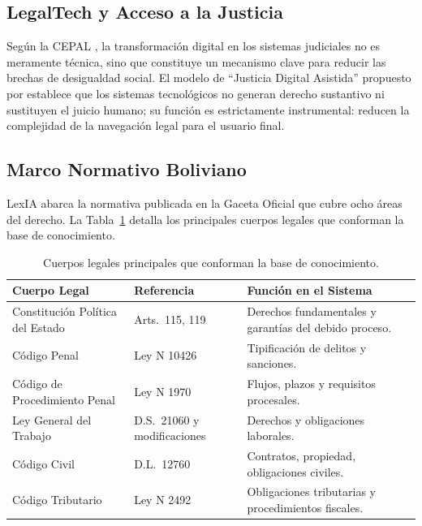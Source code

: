 \documentclass[12pt, letterpaper]{report}
\begin{document}
\subsection{LegalTech y Acceso a la Justicia}

Seg\'{u}n la CEPAL \cite{cepal2021}, la transformaci\'{o}n digital en los sistemas judiciales no es meramente t\'{e}cnica, sino que constituye un mecanismo clave para reducir las brechas de desigualdad social. El modelo de ``Justicia Digital Asistida'' propuesto por \textcite{susskind2019} establece que los sistemas tecnol\'{o}gicos no generan derecho sustantivo ni sustituyen el juicio humano; su funci\'{o}n es estrictamente instrumental: reducen la complejidad de la navegaci\'{o}n legal para el usuario final.

\subsection{Marco Normativo Boliviano}

LexIA abarca la normativa publicada en la Gaceta Oficial que cubre ocho \'{a}reas del derecho. La Tabla~\ref{tab:marco_normativo} detalla los principales cuerpos legales que conforman la base de conocimiento.

\begin{table}[H]
  \centering
  \renewcommand{\arraystretch}{1.4}
  \caption{Cuerpos legales principales que conforman la base de conocimiento.}
  \label{tab:marco_normativo}
  \begin{tabular}{|p{}|p{}|p{}|}
  \hline
  \textbf{Cuerpo Legal} & \textbf{Referencia} & \textbf{Funci\'{o}n en el Sistema} \\ \hline
  Constituci\'{o}n Pol\'{i}tica del Estado & Arts.~115, 119 & Derechos fundamentales y garant\'{i}as del debido proceso. \\ \hline
  C\'{o}digo Penal & Ley N\textdegree{} 10426 & Tipificaci\'{o}n de delitos y sanciones. \\ \hline
  C\'{o}digo de Procedimiento Penal & Ley N\textdegree{} 1970 & Flujos, plazos y requisitos procesales. \\ \hline
  Ley General del Trabajo & D.S.~21060 y modificaciones & Derechos y obligaciones laborales. \\ \hline
  C\'{o}digo Civil & D.L.~12760 & Contratos, propiedad, obligaciones civiles. \\ \hline
  C\'{o}digo Tributario & Ley N\textdegree{} 2492 & Obligaciones tributarias y procedimientos fiscales. \\ \hline
  \end{tabular}
\end{table}
\end{document}
